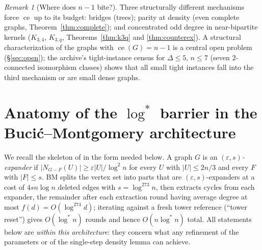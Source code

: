\documentclass[a4paper,11pt]{amsart}
\theoremstyle{definition}
\theoremstyle{remark}
\newtheorem{remark}[theorem]{Remark}
\newcommand{\ce}{\operatorname{ce}}
\begin{document}
\begin{remark}[Where does $n-1$ bite?]\label{rem:bite}
Three structurally different mechanisms force $\ce$ up to its budget: bridges (trees); parity at density
(even complete graphs, Theorem~\ref{thm:complete}); and concentrated odd degree in near-bipartite kernels
($K_{3,4}$, $K_{3,q}$, Theorems~\ref{thm:k3q} and \ref{thm:counterex}). A structural characterization of the
graphs with $\ce(G)=n-1$ is a central open problem (\S\ref{sec:open}); the archive's tight-instance census
for $\Delta\le5$, $n\le7$ (seven $2$-connected isomorphism classes) shows that all small tight instances
fall into the third mechanism or are small dense graphs.
\end{remark}

\section{Anatomy of the $\log^*$ barrier in the Buci\'c--Montgomery architecture}\label{sec:bm}

We recall the skeleton of \cite{BM22} in the form needed below. A graph $G$ is an \emph{$(\varepsilon,s)$-expander}
if $|N_{G-F}(U)|\ge\varepsilon|U|/\log^2 n$ for every $U$ with $|U|\le 2n/3$ and every $F$ with $|F|\le s$.
BM splits the vertex set into parts that are $(\varepsilon,s)$-expanders at a cost of $4sn\log n$ deleted
edges with $s=\log^{273}n$, then extracts cycles from each expander, the remainder after each extraction
round having average degree at most $f(d)=O(\log^{274}d)$; iterating against a fresh tower reference
(``tower reset'') gives $O(\log^* n)$ rounds and hence $O(n\log^* n)$ total. All statements below are
\emph{within this architecture}: they concern what any refinement of the parameters or of the single-step
density lemma can achieve.
\end{document}
